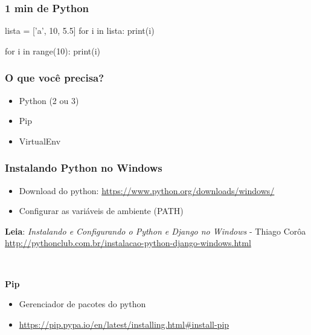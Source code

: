 \documentclass[aspectratio=169]{beamer}
\begin{document}
\begin{frame}[fragile]\frametitle{1 min de Python}

\begin{pythoncode}
    lista = ['a', 10, 5.5]
    for i in lista:
        print(i)

    for i in range(10):
        print(i)

\end{pythoncode}

\end{frame}

\begin{frame}\frametitle{O que voc\^e precisa?}

\begin{itemize}
	\item Python (2 ou 3)
	\item Pip
	\item VirtualEnv
\end{itemize}\textbf{}

\end{frame}

\begin{frame}\frametitle{Instalando Python no Windows}

\begin{itemize}
	\item Download do python: \url{https://www.python.org/downloads/windows/}
	\item Configurar as vari\'aveis de ambiente (PATH)
\end{itemize}

\textbf{Leia}: \textit{Instalando e Configurando o Python e Django no Windows} - Thiago Cor\^oa \url{http://pythonclub.com.br/instalacao-python-django-windows.html}

\

\textbf{Pip}
\begin{itemize}
	\item Gerenciador de pacotes do python
	\item \url{https://pip.pypa.io/en/latest/installing.html\#install-pip}
\end{itemize}

\end{frame}
\end{document}
